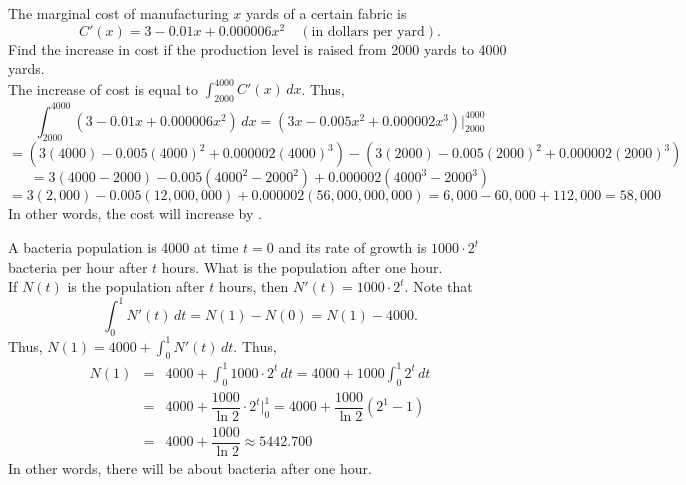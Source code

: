 \documentclass{book}
\newcommand{\dx}{\,dx}
\newcommand{\dt}{\,dt}
\newcommand{\dint}{\displaystyle \int}
\begin{document}
\begin{Exam} The marginal cost of manufacturing $x$ yards of a certain fabric is 
\[C'(x) = 3-0.01x+0.000006x^2\quad (\text{in dollars per yard}).\] Find the increase in cost if the production level is raised from 2000 yards to 4000 yards.\\

The increase of cost is equal to $\dint_{2000}^{4000} C'(x)\dx$. Thus,
\[\dint_{2000}^{4000} (3-0.01x+0.000006x^2)\dx = (3x-0.005x^2+0.000002x^3)\bigg|_{2000}^{4000}\]
 \[=(3(4000)-0.005(4000)^2+0.000002(4000)^3) - (3(2000)-0.005(2000)^2+0.000002(2000)^3)\]
\[= 3(4000-2000) -0.005(4000^2-2000^2)+0.000002(4000^3-2000^3)\]
\[ = 3(2,000) -0.005(12,000,000)+0.000002(56,000,000,000) = 6,000 - 60,000+ 112,000 = 58,000\]
 In other words, the cost will increase by .
\end{Exam}\vs

\begin{Exam} A bacteria population is 4000 at time $t=0$ and its rate of growth is $1000\cdot2^t$ bacteria per hour after $t$ hours. What is the population after one hour.\\

If $N(t)$ is the population after $t$ hours, then $N'(t)=1000\cdot 2^t$.  Note that \[\int_0^1 N'(t)\dt = N(1) - N(0) = N(1) - 4000.\] Thus, $N(1) = 4000 + \dint_0^1 N'(t)\dt$. Thus,
\begin{eqnarray*}
N(1) &=& 4000 + \int_0^1 1000\cdot 2^t\dt = 4000+1000\int_0^1 2^t\dt\\
 &=& 4000+\dfrac{1000}{\ln 2}\cdot 2^t\bigg|_0^1 = 4000+\dfrac{1000}{\ln 2}(2^1-1)\\
 & =& 4000+\dfrac{1000}{\ln 2} \approx 5442.700
\end{eqnarray*}
 In other words, there will be about  bacteria after one hour.
\end{Exam}


\vfill
{}
\pagebreak

\end{document}
